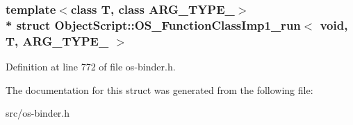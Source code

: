 \subsubsection*{template$<$class T, class A\+R\+G\+\_\+\+T\+Y\+P\+E\+\_$>$\\*
struct Object\+Script\+::\+O\+S\+\_\+\+Function\+Class\+Imp1\+\_\+run$<$ void, T,   A\+R\+G\+\_\+\+T\+Y\+P\+E\+\_ $>$}



Definition at line 772 of file os-\/binder.\+h.



The documentation for this struct was generated from the following file\+:\begin{DoxyCompactItemize}
\item 
src/os-\/binder.\+h\end{DoxyCompactItemize}
